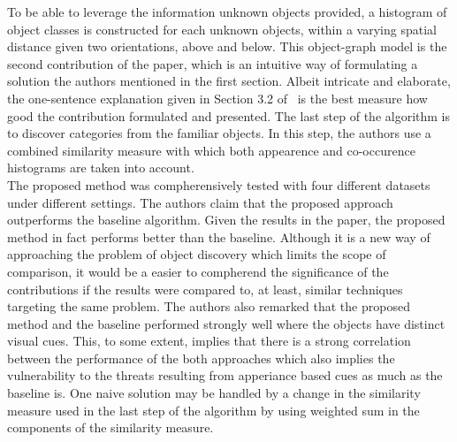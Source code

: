 \documentclass[11pt]{article}
\begin{document}
To be able to leverage the information unknown objects provided, a histogram of object classes is constructed for each unknown objects, within a varying spatial distance given two orientations, above and below.
This object-graph model is the second contribution of the paper, which is an intuitive way of formulating a solution the authors mentioned in the first section.
Albeit intricate and elaborate, the one-sentence explanation given in Section 3.2 of~\cite{lee2012object} is the best measure how good the contribution formulated and presented.
The last step of the algorithm is to discover categories from the familiar objects.
In this step, the authors use a combined similarity measure with which both appearence and co-occurence histograms are taken into account.\\
\indent The proposed method was compherensively tested with four different datasets under different settings.
The authors claim that the proposed approach outperforms the baseline algorithm.
Given the results in the paper, the proposed method in fact performs better than the baseline.
Although it is a new way of approaching the problem of object discovery which limits the scope of comparison, it would be a easier to compherend the significance of the contributions if the results were compared to, at least, similar techniques targeting the same problem.
The authors also remarked that the proposed method and the baseline performed strongly well where the objects have distinct visual cues.
This, to some extent, implies that there is a strong correlation between the performance of the both approaches which also implies the vulnerability to the threats resulting from apperiance based cues as much as the baseline is.
One naive solution may be handled by a change in the similarity measure used in the last step of the algorithm by using weighted sum in the components of the similarity measure. %


\end{document}
